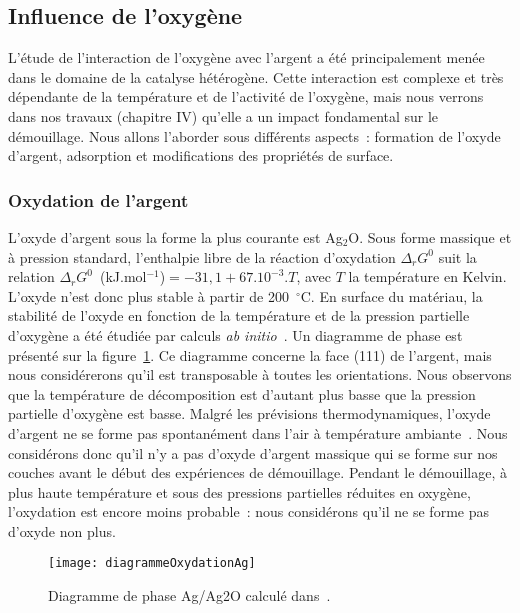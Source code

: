 	\subsection{Influence de l'oxygène}
L'étude de l'interaction de l'oxygène avec l'argent a été principalement menée dans le domaine de la catalyse hétérogène. Cette interaction est complexe et très dépendante de la température et de l'activité de l'oxygène, mais nous verrons dans nos travaux (chapitre IV) qu'elle a un impact fondamental sur le démouillage. Nous allons l'aborder sous différents aspects~: formation de l'oxyde d'argent, adsorption et modifications des propriétés de surface.\par 

		\subsubsection{Oxydation de l'argent}
L'oxyde d'argent sous la forme la plus courante est Ag$_2$O. Sous forme massique et à pression standard, l'enthalpie libre de la réaction d'oxydation  $\Delta_rG^0$ suit la relation $\Delta_rG^0$~(kJ.mol$^{-1}$)$=-31,1+67.10^{-3}.T$, avec $T$ la température en Kelvin. L'oxyde n'est donc plus stable à partir de 200~$^\circ$C. En surface du matériau, la stabilité de l'oxyde en fonction de la température et de la pression partielle d'oxygène a été étudiée par calculs \textit{ab initio}~\cite{michaelides2003structures}. Un diagramme de phase est présenté sur la figure~\ref{diagrammeOxydationAg}. Ce diagramme concerne la face (111) de l'argent, mais nous considérerons qu'il est transposable à toutes les orientations. Nous observons que la température de décomposition est d'autant plus basse que la pression partielle d'oxygène est basse. Malgré les prévisions thermodynamiques, l'oxyde d'argent ne se forme pas spontanément dans l'air à température ambiante~\cite{rehren1991interaction}. Nous considérons donc qu'il n'y a pas d'oxyde d'argent massique qui se forme sur nos couches avant le début des expériences de démouillage. Pendant le démouillage, à plus haute température et sous des pressions partielles réduites en oxygène, l'oxydation est encore moins probable~: nous considérons qu'il ne se forme pas d'oxyde non plus.\par  
\begin{figure}[!htb]
	\centering
	\texttt{[image: diagrammeOxydationAg]}
	\caption{Diagramme de phase Ag/Ag2O calculé dans~\cite{michaelides2003structures}.}
	\label{diagrammeOxydationAg}
\end{figure}
